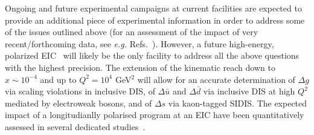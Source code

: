 Ongoing and future experimental campaigns at current facilities are
expected to provide an additional piece of experimental information
in order to address some of the issues outlined above (for an 
assessment of the impact of very recent/forthcoming data, see {\it e.g.}
Refs.~\cite{Aschenauer:2015eha,Aschenauer:2015ata,Nocera:2015vva,
Nocera:2017wep}).
%
However, a future high-energy, polarized EIC~\cite{Accardi:2012qut} will 
likely be the only facility to address all the above questions with the 
highest precision. 
% 
The extension of the kinematic reach down to $x\sim 10^{-4}$ and up to
$Q^2=10^4$ GeV$^2$ will allow for an accurate determination of $\Delta g$
via scaling violations in inclusive DIS, of $\Delta\bar{u}$ and 
$\Delta\bar{d}$ via inclusive DIS at high $Q^2$ mediated by electroweak bosons,
and of $\Delta s$ via kaon-tagged SIDIS. 
%
The expected impact of a longitudianlly polarised program at an EIC
have been quantitatively assessed in several dedicated 
studies~\cite{Aschenauer:2012ve,Ball:2013tyh,Aschenauer:2013iia,
Aschenauer:2015ata}.
